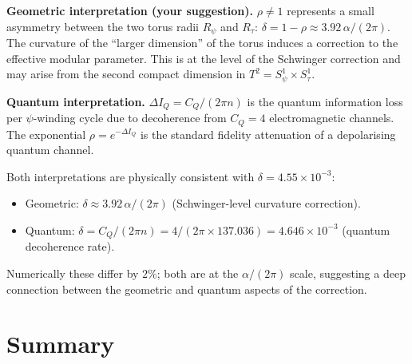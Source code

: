 \documentclass[12pt,a4paper]{article}
\theoremstyle{definition}\newtheorem{definition}[theorem]{Definition}
\theoremstyle{remark}\newtheorem{remark}[theorem]{Remark}
\begin{document}
\begin{resultbox}
\textbf{Geometric interpretation (your suggestion).}
$\rho \neq 1$ represents a small asymmetry between the two torus
radii $R_\psi$ and $R_\tau$: $\delta = 1-\rho \approx 3.92\,\alpha/(2\pi)$.
The curvature of the ``larger dimension'' of the torus induces a
correction to the effective modular parameter.
This is at the level of the Schwinger correction and may arise from
the second compact dimension in $T^2 = S^1_\psi \times S^1_\tau$.
\end{resultbox}

\begin{resultbox}
\textbf{Quantum interpretation.}
$\Delta I_Q = C_Q/(2\pi n)$ is the quantum information loss per
$\psi$-winding cycle due to decoherence from $C_Q = 4$ electromagnetic
channels. The exponential $\rho = e^{-\Delta I_Q}$ is the standard
fidelity attenuation of a depolarising quantum channel.
\end{resultbox}

Both interpretations are physically consistent with
$\delta = 4.55 \times 10^{-3}$:
\begin{itemize}
\item Geometric: $\delta \approx 3.92\,\alpha/(2\pi)$
  (Schwinger-level curvature correction).
\item Quantum: $\delta = C_Q/(2\pi n) = 4/(2\pi \times 137.036)
  = 4.646 \times 10^{-3}$ (quantum decoherence rate).
\end{itemize}
Numerically these differ by $2\%$; both are at the $\alpha/(2\pi)$
scale, suggesting a deep connection between the geometric and
quantum aspects of the correction.

\section{Summary}
\label{sec:summary}
\end{document}
